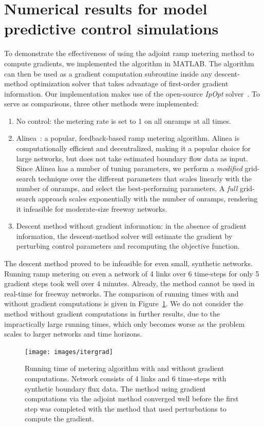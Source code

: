 
\section{Numerical results for model predictive control simulations\label{sec:Numerical-results-for}}

To demonstrate the effectiveness of using the adjoint ramp metering
method to compute gradients, we implemented the algorithm in MATLAB.
The algorithm can then be used as a gradient computation subroutine
inside any descent-method optimization solver that takes advantage
of first-order gradient information. Our implementation makes use
of the open-source \emph{IpOpt} solver~\cite{Andreas2005}. To serve
as comparisons, three other methods were implemented:
\begin{enumerate}
\item No control: the metering rate is set to 1 on all onramps at all times.
\item Alinea~\cite{Papageorgiou1991}: a popular, feedback-based ramp metering
algorithm. Alinea is computationally efficient and decentralized,
making it a popular choice for large networks, but does not take estimated
boundary flow data as input. Since Alinea has a number of tuning parameters,
we perform a \emph{modified} grid-search technique over the different
parameters that scales linearly with the number of onramps, and select
the best-performing parameters. A \emph{full} grid-search approach
scales exponentially with the number of onramps, rendering it infeasible
for moderate-size freeway networks.
\item Descent method without gradient information: in the absence of gradient
information, the descent-method solver will estimate the gradient
by perturbing control parameters and recomputing the objective function.
\end{enumerate}
The descent method proved to be infeasible for even small, synthetic
networks. Running ramp metering on even a network of 4 links over
6 time-steps for only 5 gradient steps took well over 4 minutes. Already,
the method cannot be used in real-time for freeway networks. The comparison
of running times with and without gradient computations is given in
Figure~\ref{fig:Running-time-of}. We do not consider the method
without gradient computations in further results, due to the impractically
large running times, which only becomes worse as the problem scales
to larger networks and time horizons.
\begin{figure}
\begin{centering}
\texttt{[image: images/itergrad]}
\par\end{centering}

\caption{Running time of metering algorithm with and without gradient computations.
Network consists of 4 links and 6 time-steps with synthetic boundary
flux data. The method using gradient computations via the adjoint
method converged well before the first step was completed with the
method that used perturbations to compute the gradient.\label{fig:Running-time-of}}
\end{figure}



